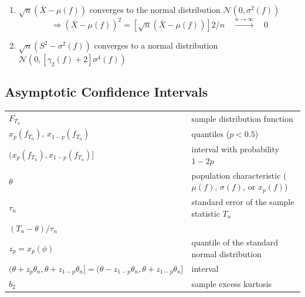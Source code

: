 \begin{enumerate}
\begin{enumerate}
        \item $\sqrt{n}(\bar{X} - \mu( f ))$ converges to the normal distribution $\mathcal{N}(0, \sigma^2( f ))$
        \[
            \Rightarrow
            (\bar{X} - \mu( f ))^2 
            = [\sqrt{n}(\bar{X} - \mu( f ))]2/n 
            \quad
            \overset{n\to \infty}{\longrightarrow}
            \quad
            0
        \]

        \item $\sqrt{n}(S^2 - \sigma^2( f ))$ converges to a normal distribution $\mathcal{N}(0,[\gamma_2( f ) + 2]\sigma^4( f ))$
    \end{enumerate}

    
\end{enumerate}

\subsection{Asymptotic Confidence Intervals \cite{ism-1}} \label{sample statistic: Asymptotic Confidence Intervals}

\begin{customTableWrapper}{1.5}
\begin{longtable}[H]{l l}
    $F_{T_n}$ & sample distribution function \\

    $x_p( f_{T_n} )$, $x_{1-p}( f_{T_n} )$ & quantiles ($p < 0.5$)\\

    $(x_p( f_{T_n} ), x_{1-p}( f_{T_n} )]$ & interval with probability $1 - 2p$\\

    $\theta$ & population characteristic ($\mu( f )$, $\sigma ( f )$, or $x_p( f )$)\\

    $\tau_n$ & standard error of the sample statistic $T_n$ \\

    $(T_n - \theta )/\tau_n$ & \\

    $z_p = x_p (\phi)$ & quantile of the standard normal distribution\\

    $(\theta + z_p\theta_n, \theta + z_{1-p}\theta_n] = (\theta - z_{1-p}\theta_n, \theta + z_{1-p}\theta_n]$ & interval\\

    $b_2$ & sample excess kurtosis\\
\end{longtable}
\end{customTableWrapper}

